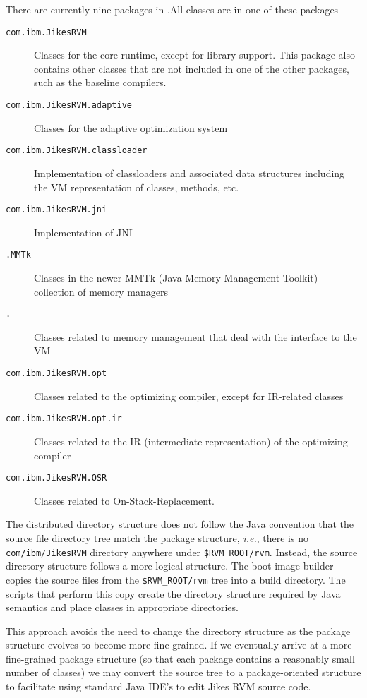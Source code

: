 There are currently nine packages in \jrvm.\@  All classes are in
one of these packages
\begin{description}
\item[\texttt{com.ibm.JikesRVM}] Classes for the core runtime, except for library
support.  This package also contains other classes that are not
included in one of the other packages, such as the baseline compilers. 

\item[\texttt{com.ibm.JikesRVM.adaptive}] Classes for the adaptive optimization system

\item[\texttt{com.ibm.JikesRVM.classloader}] Implementation of classloaders
and associated data structures including the VM representation of classes,
methods, etc. 

\item[\texttt{com.ibm.JikesRVM.jni}] Implementation of JNI

\item[\texttt{\MMpackage{}\-.MMTk}] Classes in the newer MMTk
(Java\TMweb{} Memory Management Toolkit) collection of memory managers

\item[\texttt{\MMpackage\-.\vmInterface{}}] Classes related to
memory management that deal with the interface to the VM

\item[\texttt{com.ibm.JikesRVM.opt}] Classes related to the optimizing
compiler, except for IR-related classes

\item[\texttt{com.ibm.JikesRVM.opt.ir}] Classes related to the IR
(intermediate representation) of the optimizing compiler

\item[\texttt{com.ibm.JikesRVM.OSR}] Classes related to On-Stack-Replacement. 

\end{description}

The distributed directory structure
does not follow the Java convention that the source file directory tree
match the package structure, {\it i.e.},
there is no {\tt com/ibm/JikesRVM} directory anywhere under \texttt{\$RVM\_ROOT/rvm}.  Instead, the source directory structure follows a more logical 
structure.  The boot image builder
copies the source files from the \texttt{\$RVM\_ROOT/rvm} tree into a build
directory.  The scripts that perform this copy create the directory
structure required by Java semantics and place classes in appropriate
directories.

This approach avoids the need to change the directory structure as the
package structure evolves to become more fine-grained. If we
eventually arrive at a more fine-grained package structure (so that
each package contains a reasonably small number of classes) we may
convert the source tree to a package-oriented structure to facilitate
using standard Java IDE's to edit Jikes RVM source code.

